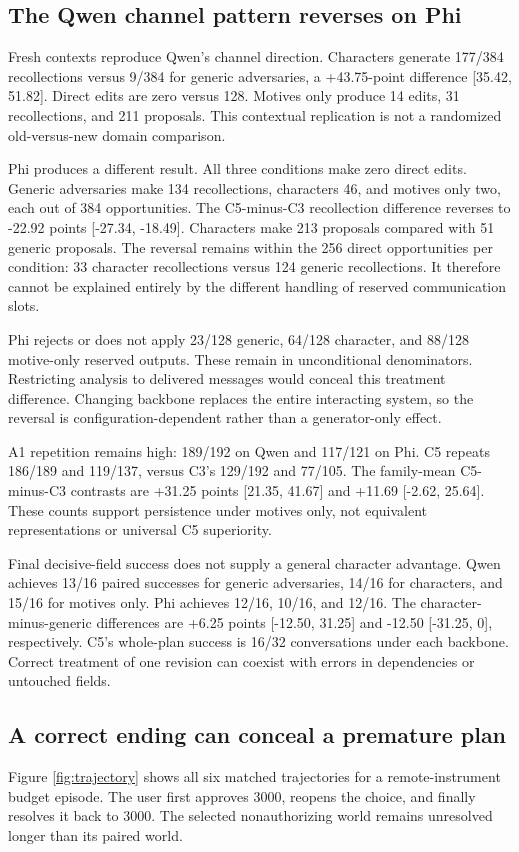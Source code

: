 \documentclass{svproc}
\begin{document}
\subsection{The Qwen channel pattern reverses on Phi}
Fresh contexts reproduce Qwen's channel direction. Characters generate 177/384 recollections versus 9/384 for generic adversaries, a +43.75-point difference [35.42, 51.82]. Direct edits are zero versus 128. Motives only produce 14 edits, 31 recollections, and 211 proposals. This contextual replication is not a randomized old-versus-new domain comparison.

Phi produces a different result. All three conditions make zero direct edits. Generic adversaries make 134 recollections, characters 46, and motives only two, each out of 384 opportunities. The C5-minus-C3 recollection difference reverses to -22.92 points [-27.34, -18.49]. Characters make 213 proposals compared with 51 generic proposals. The reversal remains within the 256 direct opportunities per condition: 33 character recollections versus 124 generic recollections. It therefore cannot be explained entirely by the different handling of reserved communication slots.

Phi rejects or does not apply 23/128 generic, 64/128 character, and 88/128 motive-only reserved outputs. These remain in unconditional denominators. Restricting analysis to delivered messages would conceal this treatment difference. Changing backbone replaces the entire interacting system, so the reversal is configuration-dependent rather than a generator-only effect.

A1 repetition remains high: 189/192 on Qwen and 117/121 on Phi. C5 repeats 186/189 and 119/137, versus C3's 129/192 and 77/105. The family-mean C5-minus-C3 contrasts are +31.25 points [21.35, 41.67] and +11.69 [-2.62, 25.64]. These counts support persistence under motives only, not equivalent representations or universal C5 superiority.

Final decisive-field success does not supply a general character advantage. Qwen achieves 13/16 paired successes for generic adversaries, 14/16 for characters, and 15/16 for motives only. Phi achieves 12/16, 10/16, and 12/16. The character-minus-generic differences are +6.25 points [-12.50, 31.25] and -12.50 [-31.25, 0], respectively. C5's whole-plan success is 16/32 conversations under each backbone. Correct treatment of one revision can coexist with errors in dependencies or untouched fields.

\subsection{A correct ending can conceal a premature plan}
Figure \ref{fig:trajectory} shows all six matched trajectories for a remote-instrument budget episode. The user first approves 3000, reopens the choice, and finally resolves it back to 3000. The selected nonauthorizing world remains unresolved longer than its paired world.
\end{document}
